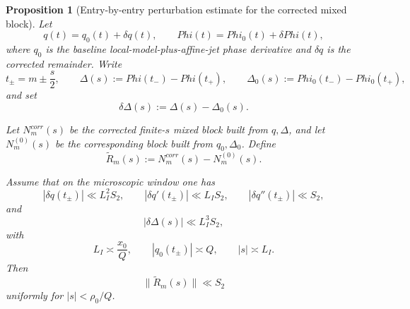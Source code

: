 \documentclass[11pt,a4paper]{amsart}
\def\Phi{Phi}%
\def\corr{corr}%
\theoremstyle{plain}
\newtheorem{proposition}[theorem]{Proposition}
\theoremstyle{definition}
\newcommand{\corr}{\mathrm{corr}}
\begin{document}
\begin{proposition}[Entry-by-entry perturbation estimate for the corrected mixed block]
\label{prop:cross-block-perturbation}
Let
\[
q(t)=q_0(t)+\delta q(t),
\qquad
\Phi(t)=\Phi_0(t)+\delta\Phi(t),
\]
where $q_0$ is the baseline local-model-plus-affine-jet phase derivative and
$\delta q$ is the corrected remainder. Write
\[
t_\pm=m\pm \frac{s}{2},
\qquad
\Delta(s):=\Phi(t_-)-\Phi(t_+),
\qquad
\Delta_0(s):=\Phi_0(t_-)-\Phi_0(t_+),
\]
and set
\[
\delta\Delta(s):=\Delta(s)-\Delta_0(s).
\]

Let $N_m^{\corr}(s)$ be the corrected finite-$s$ mixed block built from
$q,\Delta$, and let $N_m^{(0)}(s)$ be the corresponding block built from
$q_0,\Delta_0$. Define
\[
\widetilde R_m(s):=N_m^{\corr}(s)-N_m^{(0)}(s).
\]

Assume that on the microscopic window one has
\[
|\delta q(t_\pm)|\ll L_I^2S_2,
\qquad
|\delta q'(t_\pm)|\ll L_I S_2,
\qquad
|\delta q''(t_\pm)|\ll S_2,
\]
and
\[
|\delta\Delta(s)|\ll L_I^3S_2,
\]
with
\[
L_I\asymp \frac{x_0}{Q},
\qquad
|q_0(t_\pm)|\asymp Q,
\qquad
|s|\asymp L_I.
\]
Then
\[
\boxed{\ \|\widetilde R_m(s)\|\ll S_2\ }
\]
uniformly for $|s|<\rho_0/Q$.
\end{proposition}
\end{document}

